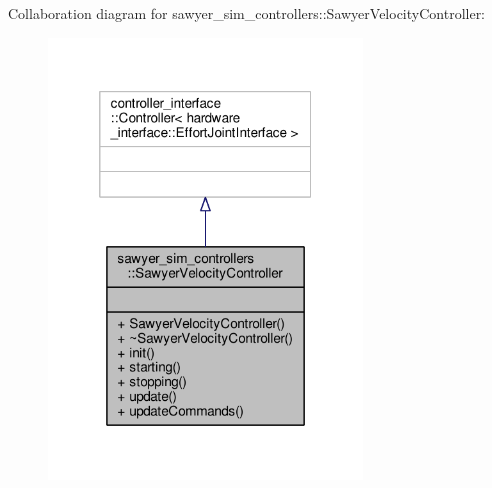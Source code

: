 Collaboration diagram for sawyer\-\_\-sim\-\_\-controllers\-:\-:Sawyer\-Velocity\-Controller\-:
\nopagebreak
\begin{figure}[H]
\begin{center}
\leavevmode
\includegraphics[width=236pt]{classsawyer__sim__controllers_1_1_sawyer_velocity_controller__coll__graph}
\end{center}
\end{figure}
